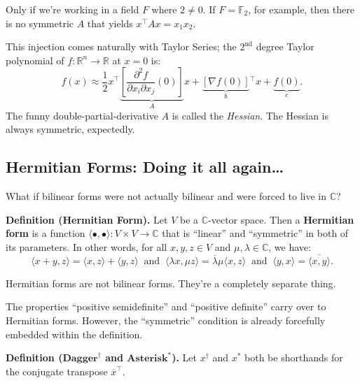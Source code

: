\begin{remark}
    Only if we're working in a field $F$ where $2 \neq 0$.  If $F = \mathbb{F}_2$, for example, then there is no symmetric $A$ that yields $x^{\top}Ax = x_1x_2$.
\end{remark}

This injection comes naturally with Taylor Series; the $2^{\text{nd}}$ degree Taylor polynomial of $f: \mathbb{R}^n \to \mathbb{R}$ at $x = 0$ is:
\[ f(x) \approx \dfrac{1}{2} x^{\top} \!\underbrace{\left[\dfrac{\partial^2 f}{\partial x_i \partial x_j}(0)\right]}_{A} x  + \underbrace{\left[\nabla f(0)\right]}_{b} \!^{\top}x + \underbrace{f(0)}_{c}. \]
The funny double-partial-derivative $A$ is called the \emph{Hessian}.  The Hessian is always symmetric, expectedly.



\subsection{Hermitian Forms: Doing it all again\dots}

What if bilinear forms were not actually bilinear and were forced to live in $\mathbb{C}$?

\textbf{Definition (Hermitian Form).} Let $V$ be a $\mathbb{C}$-vector space.  Then a \textbf{Hermitian form} is a function $\langle \bullet, \bullet \rangle : V \times V \to \mathbb{C}$ that is ``linear'' and ``symmetric'' in both of its parameters.  In other words, for all $x, y, z \in V$ and $\mu, \lambda \in \mathbb{C}$, we have:
\[ \langle x + y, z \rangle = \langle x, z \rangle + \langle y, z \rangle ~ \text{ and } ~ \langle \lambda x, \mu z \rangle = \overline{\lambda} \mu \langle x, z \rangle ~ \text{ and } ~ \langle y, x \rangle = \overline{\langle x, y \rangle} .\]
\begin{remark}
    Hermitian forms are not bilinear forms.  They're a completely separate thing.
\end{remark}

\begin{remark}
The properties ``positive semidefinite'' and ``positive definite'' carry over to Hermitian forms. However, the ``symmetric'' condition is already forcefully embedded within the definition.
\end{remark}

\textbf{Definition ($\textbf{Dagger}^\dagger$ and $\textbf{Asterisk}^*$).} Let $x^{\dagger}$ and $x^*$ both be shorthands for the conjugate transpose $\overline{x}^{\top}$.

